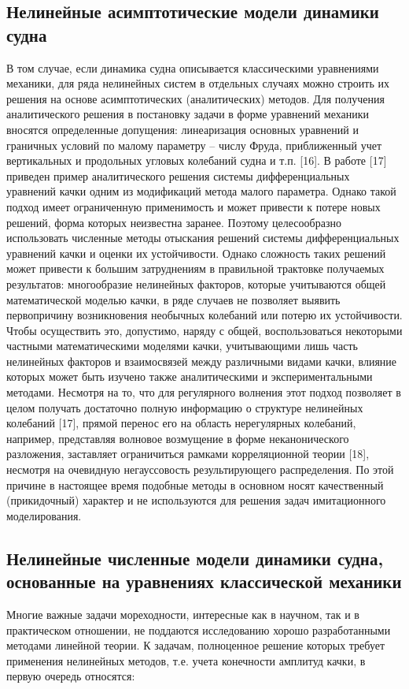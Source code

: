 \subsection{Нелинейные асимптотические модели динамики судна}
В том случае, если динамика судна описывается классическими уравнениями механики, для ряда нелинейных систем в отдельных случаях можно строить их решения на основе асимптотических (аналитических) методов. Для получения аналитического решения в постановку задачи в форме уравнений механики вносятся определенные допущения: линеаризация основных уравнений и граничных условий по малому параметру – числу Фруда, приближенный учет вертикальных и продольных угловых колебаний судна и т.п. [16]. В работе [17] приведен пример аналитического решения системы дифференциальных уравнений качки одним из модификаций метода малого параметра. Однако такой подход имеет ограниченную применимость и может привести к потере новых решений, форма которых неизвестна заранее. Поэтому целесообразно использовать численные методы отыскания решений системы дифференциальных уравнений качки и оценки их устойчивости. Однако сложность таких решений может привести к большим затруднениям в правильной трактовке получаемых результатов: многообразие нелинейных факторов, которые учитываются общей математической моделью качки, в ряде случаев не позволяет выявить первопричину возникновения необычных колебаний или потерю их устойчивости. Чтобы осуществить это, допустимо, наряду с общей, воспользоваться некоторыми частными математическими моделями качки, учитывающими лишь часть нелинейных факторов и взаимосвязей между различными видами качки, влияние которых может быть изучено также аналитическими и экспериментальными методами. Несмотря на то, что для регулярного волнения этот подход позволяет в целом получать достаточно полную информацию о структуре нелинейных колебаний [17], прямой перенос его на область нерегулярных колебаний, например, представляя волновое возмущение в форме неканонического разложения, заставляет ограничиться рамками корреляционной теории [18], несмотря на очевидную негауссовость результирующего распределения. По этой причине в настоящее время подобные методы в основном носят качественный (прикидочный) характер и не используются для решения задач имитационного моделирования.

\subsection{Нелинейные численные модели динамики судна, основанные на уравнениях классической механики}
Многие важные задачи мореходности, интересные как в научном, так и в практическом отношении, не поддаются исследованию хорошо разработанными методами линейной теории. К задачам, полноценное решение которых требует применения нелинейных методов, т.е. учета конечности амплитуд качки, в первую очередь относятся:

